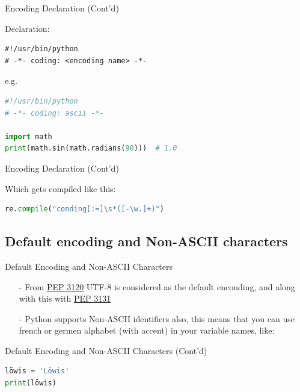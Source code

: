 \documentclass[aspectratio=169, dvipsnames, svgnames, x11names]{beamer}
\begin{document}
\begin{frame}[fragile]{Encoding Declaration (Cont'd)}

\begin{flushleft}
Declaration:
\begin{lstlisting}
#!/usr/bin/python
# -*- coding: <encoding name> -*-
\end{lstlisting}
\end{flushleft}

\begin{flushleft}
e.g.
\begin{lstlisting}[language=python, keywordstyle=\color{Mulberry}\textbf]
#!/usr/bin/python
# -*- coding: ascii -*-

import math
print(math.sin(math.radians(90)))  # 1.0
\end{lstlisting}
\end{flushleft}
\end{frame}

\begin{frame}[fragile]{Encoding Declaration (Cont'd)}
\begin{flushleft}
Which gets compiled like this:
\begin{lstlisting}[language=python]
re.compile("conding[:=]\s*([-\w.]+)")
\end{lstlisting}
\end{flushleft}
\end{frame}

\subsection{Default encoding and Non-ASCII characters}
\begin{frame}{Default Encoding and Non-ASCII Characters}
\begin{itemize}
\item[-]
From \href{https://peps.python.org/pep-3120/}{PEP 3120} UTF-8 is considered as the default enconding, and along with this with \href{https://peps.python.org/pep-3131/}{PEP 3131}

\item[-]
Python supports Non-ASCII identifiers also, this means that you can use french or germen alphabet
(with accent) in your variable names, like:
\end{itemize}
\end{frame}

\begin{frame}[fragile]{Default Encoding and Non-ASCII Characters (Cont'd)}
\begin{lstlisting}[language=python, keywordstyle=\color{Mulberry}\textbf]
löwis = 'Löwis'
print(löwis)
\end{lstlisting}
\end{frame}
\end{document}
